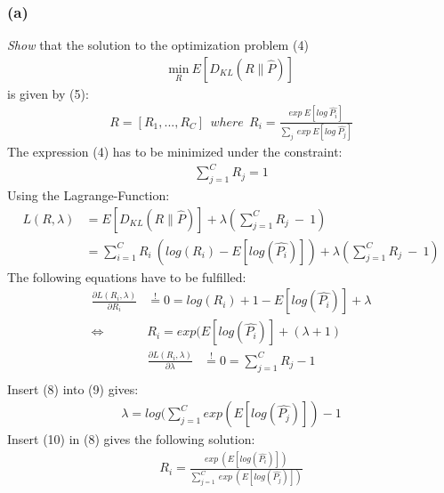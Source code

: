 \documentclass{article}
\begin{document}
\subsubsection*{(a)}
\textit{Show} that the solution to the optimization problem (4)\\
\begin{equation}
\begin{aligned}
\underset{R}{\text{min}}~ E[D_{KL} (R\parallel\hat{P})]
\end{aligned}
\end{equation}
is given by (5):\\
\begin{equation}
\begin{aligned}
R=[R_1,...,R_C] ~~ where~~ R_i = \frac{exp~E[log~\hat{P_i}]}{\sum \limits _{j}~exp~E[log~\hat{P_j}]}
\end{aligned}
\end{equation}
The expression (4) has to be minimized under the constraint:
\begin{equation}
\begin{aligned}
\sum \limits _{j=1}^{C}R_j = 1
\end{aligned}
\end{equation}
Using the Lagrange-Function:
\begin{equation}
\begin{aligned}
L(R,\lambda)&=E[D_{KL} (R\parallel\hat{P})] +\lambda(\sum \limits _{j=1}^{C}R_j~ -~ 1)\\
&=\sum \limits _{i=1}^{C}R_i~(log(R_i) - E[log(\hat{P_i})])+\lambda(\sum \limits _{j=1}^{C}R_j~ -~ 1)
\end{aligned}
\end{equation}
The following equations have to be fulfilled:
\begin{equation}
\begin{aligned}
\frac{\partial L(R_i, \lambda)}{\partial R_i} &\overset{!}{=} 0 = log(R_i)+1-E[log(\hat{P_i})] + \lambda \\
\Leftrightarrow ~ & R_i = exp(E[log(\hat{P_i})]+(\lambda+1)
\end{aligned}
\end{equation}
\begin{equation}
\begin{aligned}
\frac{\partial L(R_i, \lambda)}{\partial \lambda} &\overset{!}{=} 0 = \sum \limits _{j=1}^{C}R_j - 1\\
\end{aligned}
\end{equation}
Insert (8) into (9) gives:
\begin{equation}
\begin{aligned}
\lambda=log(\sum \limits _{j=1}^{C}exp(E[log(\hat{P_j})])-1
\end{aligned}
\end{equation}
Insert (10) in (8) gives the following solution:
\begin{equation}
\begin{aligned}
R_i = \frac{exp~(E[log(\hat{P_i})])}{\sum \limits _{j=1}^{C}~exp~(E[log(\hat{P_j})])}
\end{aligned}
\end{equation}
\end{document}
